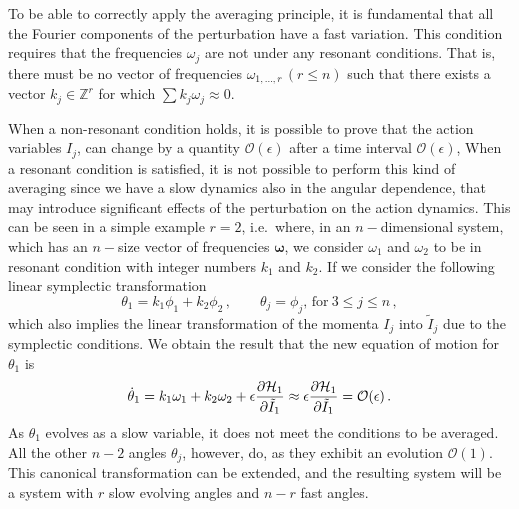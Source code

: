 To be able to correctly apply the averaging principle, it is fundamental that all the Fourier components of the perturbation have a fast variation. This condition requires that the frequencies $\omega_j$ are not under any resonant conditions. That is, there must be no vector of frequencies $\omega_{1,\ldots,r}\,(r\leq n)$ such that there exists a vector $k_j \in \mathbb{Z}^r$ for which $\sum k_j \omega_j \approx 0$.

When a non-resonant condition holds, it is possible to prove that the action variables $I_j$, can change by a quantity $\mathcal{O}(\epsilon)$ after a time interval $\mathcal{O}(\epsilon)$,  
When a resonant condition is satisfied, it is not possible to perform this kind of averaging since we have a slow dynamics also in the angular dependence, that may introduce significant effects of the perturbation on the action dynamics. This can be seen in a simple example $r=2$, i.e.\ where, in an $n-$dimensional system, which has an $n-$size vector of frequencies $\boldsymbol{\omega}$, we consider $\omega_1$ and $\omega_2$ to be in resonant condition with integer numbers $k_1$ and $k_2$. If we consider the following linear symplectic transformation
\begin{equation}
    \theta_1 = k_1 \phi_1 + k_2 \phi_2\,,\qquad \theta_j=\phi_j,\, \text{for}\ 3\leq j \leq n\,,
\end{equation}
which also implies the linear transformation of the momenta $I_j$ into $\tilde I_j$ due to the symplectic conditions. We obtain the result that the new equation of motion for $\theta_1$ is
\begin{equation}
    \dot\theta_1 = k_1\omega_1 + k_2\omega_2 + \epsilon \pdv{\mathcal{H}_1}{\tilde I_1} \approx \epsilon \pdv{\mathcal{H}_1}{\tilde I_1} = \mathcal{O}(\epsilon)\,.
\end{equation}
As $\theta_1$ evolves as a slow variable, it does not meet the conditions to be averaged. All the other $n - 2$ angles $\theta_j$, however, do, as they exhibit an evolution $\mathcal{O}(1)$. This canonical transformation can be extended, and the resulting system will be a system with $r$ slow evolving angles and $n - r$ fast angles.  



